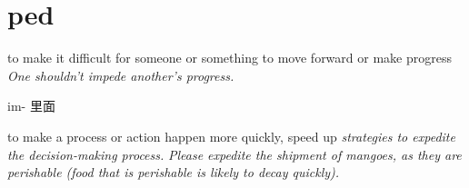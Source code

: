 \chapter{ped}

\begin{vocabulary}[pedal]
\end{vocabulary}

\begin{vocabulary} 
    to make it difficult for someone or something to move forward or make progress
    \textit{One shouldn't impede another's progress.}

    im- 里面
\end{vocabulary}

\begin{vocabulary}
    to make a process or action happen more quickly, speed up
    \textit{strategies to expedite the decision-making process.}
    \textit{Please expedite the shipment of mangoes, as they are perishable (food that is perishable is likely to decay quickly).}
\end{vocabulary}

\begin{vocabulary}[expedition]
\end{vocabulary}